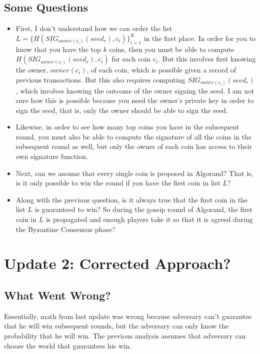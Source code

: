 \documentclass[11pt, oneside]{article}   	%
\begin{document}
\subsection{Some Questions}
\begin{itemize}
  \item First, I don't understand how we can order the list $L = \{H(SIG_{owner(c_i)}(seed_r), c_i)\}_{i=1}^K$ in the first place. In order for you to know that you have the top $k$ coins, then you must be able to compute $H(SIG_{owner(c_i)}(seed_r), c_i)$ for each coin $c_i$. But this involves first knowing the owner, $owner(c_i)$, of each coin, which is possible given a record of previous transactions. But this also requires computing $SIG_{owner(c_i)}(seed_r)$, which involves knowing the outcome of the owner signing the seed. I am not sure how this is possible because you need the owner's private key in order to sign the seed, that is, only the owner should be able to sign the seed.
  \item Likewise, in order to see how many top coins you have in the subsequent round, you must also be able to compute the signature of all the coins in the subsequent round as well, but only the owner of each coin has access to their own signature function.
  \item Next, can we assume that every single coin is proposed in Algorand? That is, is it only possible to win the round if you have the first coin in list $L$?
  \item Along with the previous question, is it always true that the first coin in the list $L$ is guaranteed to win? So during the gossip round of Algorand, the first coin in $L$ is propagated and enough players take it so that it is agreed during the Byzantine Consensus phase?
\end{itemize}

\section{Update 2: Corrected Approach?}

\subsection{What Went Wrong?}
Essentially, math from last update was wrong because adversary can't guarantee that he will win subsequent rounds, but the adversary can only know the probability that he will win. The previous analysis assumes that adversary can choose the world that guarantees his win.
\end{document}
